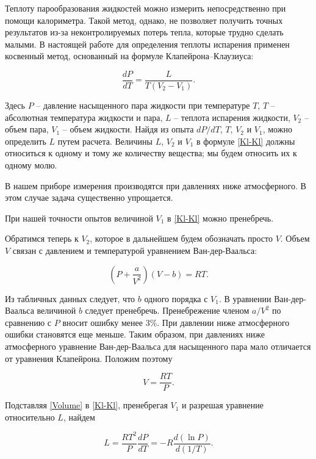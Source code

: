 \documentclass[a4paper, 12pt]{article}%
\begin{document}
	Теплоту парообразования жидкостей можно измерить непосредственно при помощи калориметра. Такой метод, однако, не позволяет получить точных результатов из-за неконтролируемых потерь тепла, которые трудно сделать малыми. В настоящей работе для определения теплоты испарения применен косвенный метод, основанный на формуле Клапейрона–Клаузиуса:
	
	\begin{equation}\label{Kl-Kl}
		\frac{dP}{dT}=\frac{L}{T\left(V_2-V_1\right)}.
	\end{equation}
	
	Здесь $ P $ -- давление насыщенного пара жидкости при температуре $ T $, $ T $ -- абсолютная температура жидкости и пара, $ L $ -- теплота испарения жидкости, $ V_2 $ -- объем пара, $ V_1 $ -- объем жидкости. Найдя из опыта $ dP/dT $, $ T $, $ V_2 $ и $ V_1 $, можно определить $ L $ путем расчета. Величины $ L $, $ V_2 $ и $ V_1 $ в формуле \eqref{Kl-Kl} должны относиться к одному и тому же количеству вещества; мы будем относить их к одному молю.
	
	В нашем приборе измерения производятся при давлениях ниже атмосферного. В этом случае задача существенно упрощается.
	
	При нашей точности опытов величиной $ V_1 $ в \eqref{Kl-Kl} можно пренебречь.
	
	Обратимся теперь к $ V_2 $, которое в дальнейшем будем обозначать просто $ V $. Объем $ V $ связан с давлением и температурой уравнением Ван-дер-Ваальса:
	
	\begin{equation}\label{VDV}
		\left(P+\frac{a}{V^2}\right)\left(V-b\right)=RT.
	\end{equation}
	
	Из табличных данных следует, что $ b $ одного порядка с $ V_1 $. В уравнении Ван-дер-Ваальса величиной $ b $ следует пренебречь. Пренебрежение членом $ a/V^2 $ по сравнению с $ P $ вносит ошибку менее 3\%. При давлении ниже атмосферного ошибки становятся еще меньше. Таким образом, при давлениях ниже атмосферного уравнение Ван-дер-Ваальса для насыщенного пара мало отличается от уравнения Клапейрона. Положим поэтому
	
	\begin{equation}\label{Volume}
		V=\frac{RT}{P}.
	\end{equation}
	
	Подставляя \eqref{Volume} в \eqref{Kl-Kl}, пренебрегая $ V_1 $ и разрешая уравнение относительно $ L $, найдем
	
	\begin{equation}\label{final}
		L=\frac{RT^2}{P}\frac{dP}{dT}=-R\frac{d(\ln P)}{d(1/T)}.
	\end{equation}
	
\end{document}
